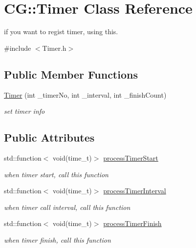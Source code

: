 \hypertarget{class_c_g_1_1_timer}{}\section{CG\+:\+:Timer Class Reference}
\label{class_c_g_1_1_timer}


if you want to regist timer, using this.  




{\ttfamily \#include $<$Timer.\+h$>$}

\subsection*{Public Member Functions}
\begin{DoxyCompactItemize}
\item 
\mbox{\hyperlink{class_c_g_1_1_timer_a3c8fc20be8fd5a16dae6ef82894b4fa1}{Timer}} (int \+\_\+timer\+No, int \+\_\+interval, int \+\_\+finish\+Count)
\begin{DoxyCompactList}\small\item\em set timer info \end{DoxyCompactList}\end{DoxyCompactItemize}
\subsection*{Public Attributes}
\begin{DoxyCompactItemize}
\item 
\mbox{\label{class_c_g_1_1_timer_a7ee60b47517a990caea93d289f3a5ff4}} 
std\+::function$<$ void(time\+\_\+t)$>$ \mbox{\hyperlink{class_c_g_1_1_timer_a7ee60b47517a990caea93d289f3a5ff4}{process\+Timer\+Start}}
\begin{DoxyCompactList}\small\item\em when timer start, call this function \end{DoxyCompactList}\item 
\mbox{\label{class_c_g_1_1_timer_a356bd1762c00b2b9410251d3f1e48cd2}} 
std\+::function$<$ void(time\+\_\+t)$>$ \mbox{\hyperlink{class_c_g_1_1_timer_a356bd1762c00b2b9410251d3f1e48cd2}{process\+Timer\+Interval}}
\begin{DoxyCompactList}\small\item\em when timer call interval, call this function \end{DoxyCompactList}\item 
\mbox{\label{class_c_g_1_1_timer_a03172466ad606010a6a3656bec707e52}} 
std\+::function$<$ void(time\+\_\+t)$>$ \mbox{\hyperlink{class_c_g_1_1_timer_a03172466ad606010a6a3656bec707e52}{process\+Timer\+Finish}}
\begin{DoxyCompactList}\small\item\em when timer finish, call this function \end{DoxyCompactList}\end{DoxyCompactItemize}
